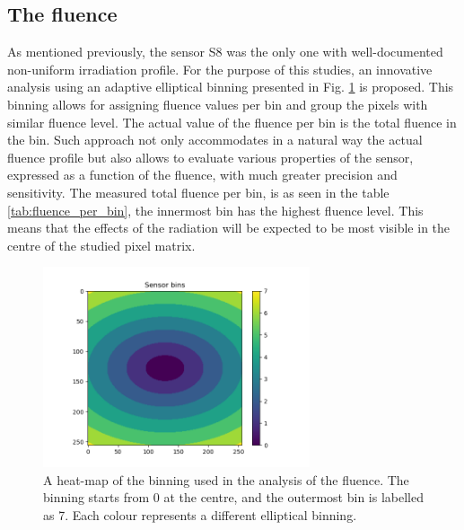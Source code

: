 \subsection{The fluence}

As mentioned previously, the sensor S8 was the only one with well-documented non-uniform irradiation profile.
For the purpose of this studies, an innovative analysis using an adaptive elliptical binning presented in Fig. \ref{fig:binning} is proposed.
This binning allows for assigning fluence values per bin and group the pixels with similar fluence level. The actual value of the fluence per bin is the total fluence in the bin. Such approach not only accommodates in a natural way the actual fluence profile but also allows to evaluate various properties of the sensor, expressed as a function of the fluence, with much greater precision and sensitivity.
The measured total fluence per bin, is as seen in the table \ref{tab:fluence_per_bin}, the innermost bin has the highest fluence level.
This means that the effects of the radiation will be expected to be most visible in the centre of the studied pixel matrix.

\begin{figure}[H]
\centering
\includegraphics[width=0.7\textwidth]{figures/chapter4/surrogates/p2_binning.png}
\caption{A heat-map of the binning used in the analysis of the fluence. The binning starts from 0 at the centre, and the outermost bin is labelled as 7. Each colour represents a different elliptical binning.} 
\label{fig:binning}
\end{figure}

